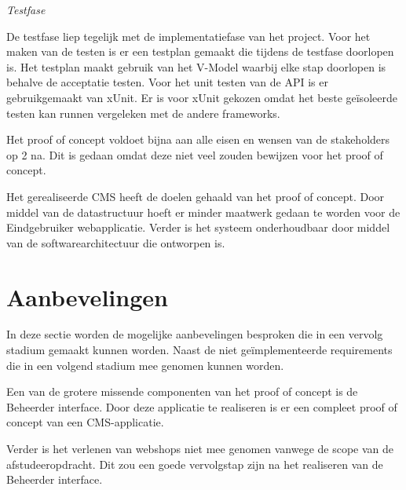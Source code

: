 \begin{center}
\textit{Testfase}
\end{center}

\whitespace
De testfase liep tegelijk met de implementatiefase van het project.
Voor het maken van de testen is er een testplan gemaakt die tijdens de testfase doorlopen is.
Het testplan maakt gebruik van het V-Model waarbij elke stap doorlopen is behalve de acceptatie testen.
Voor het unit testen van de API is er gebruikgemaakt van xUnit.
Er is voor xUnit gekozen omdat het beste geïsoleerde testen kan runnen vergeleken met de andere frameworks.

\whitespace
Het proof of concept voldoet bijna aan alle eisen en wensen van de stakeholders op 2 na.
Dit is gedaan omdat deze niet veel zouden bewijzen voor het proof of concept.
%

\whitespace
Het gerealiseerde CMS heeft de doelen gehaald van het proof of concept.
Door middel van de datastructuur hoeft er minder maatwerk gedaan te worden voor de \gls{Eindgebruiker} webapplicatie. 
Verder is het systeem onderhoudbaar door middel van de softwarearchitectuur die ontworpen is.



\section{Aanbevelingen}
In deze sectie worden de mogelijke aanbevelingen besproken die in een vervolg stadium gemaakt kunnen worden.
Naast de niet geïmplementeerde requirements die in een volgend stadium mee genomen kunnen worden.

\whitespace
Een van de grotere missende componenten van het proof of concept is de \gls{Beheerder} interface.
Door deze applicatie te realiseren is er een compleet proof of concept van een \gls{CMS}-applicatie.

\whitespace
Verder is het verlenen van webshops niet mee genomen vanwege de scope van de afstudeeropdracht.
Dit zou een goede vervolgstap zijn na het realiseren van de \gls{Beheerder} interface.
